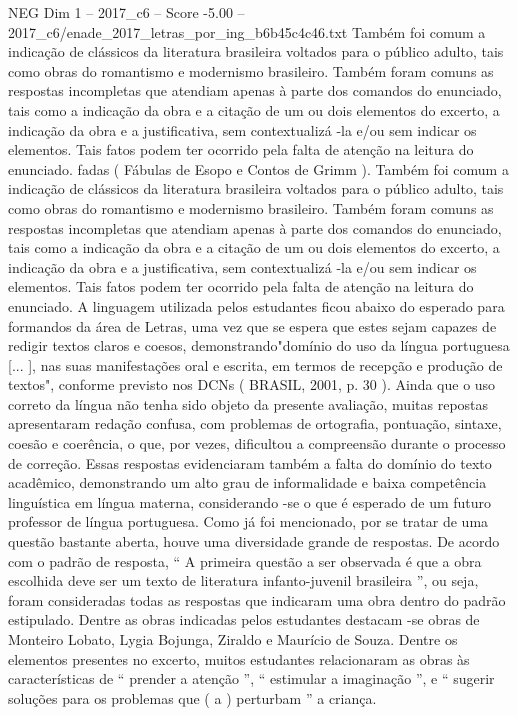 \begin{textsample}{NEG Dim 1 – 2017\_c6 – Score -5.00 – 2017\_c6/enade\_2017\_letras\_por\_ing\_b6b45c4c46.txt}
Também foi comum a indicação de clássicos da literatura brasileira voltados para o público adulto, tais como obras do romantismo e modernismo brasileiro.
Também foram comuns as respostas incompletas que atendiam apenas à parte dos comandos do enunciado, tais como a indicação da obra e a citação de um ou dois elementos do excerto, a indicação da obra e a justificativa, sem contextualizá -la e/ou sem indicar os elementos.
Tais fatos podem ter ocorrido pela falta de atenção na leitura do enunciado. fadas ( Fábulas de Esopo e Contos de Grimm ).
Também foi comum a indicação de clássicos da literatura brasileira voltados para o público adulto, tais como obras do romantismo e modernismo brasileiro.
Também foram comuns as respostas incompletas que atendiam apenas à parte dos comandos do enunciado, tais como a indicação da obra e a citação de um ou dois elementos do excerto, a indicação da obra e a justificativa, sem contextualizá -la e/ou sem indicar os elementos.
Tais fatos podem ter ocorrido pela falta de atenção na leitura do enunciado.
A linguagem utilizada pelos estudantes ficou abaixo do esperado para formandos da área de Letras, uma vez que se espera que estes sejam capazes de redigir textos claros e coesos, demonstrando"domínio do uso da língua portuguesa [... ], nas suas manifestações oral e escrita, em termos de recepção e produção de textos", conforme previsto nos DCNs ( BRASIL, 2001, p. 30 ).
Ainda que o uso correto da língua não tenha sido objeto da presente avaliação, muitas repostas apresentaram redação confusa, com problemas de ortografia, pontuação, sintaxe, coesão e coerência, o que, por vezes, dificultou a compreensão durante o processo de correção.
Essas respostas evidenciaram também a falta do domínio do texto acadêmico, demonstrando um alto grau de informalidade e baixa competência linguística em língua materna, considerando -se o que é esperado de um futuro professor de língua portuguesa.
Como já foi mencionado, por se tratar de uma questão bastante aberta, houve uma diversidade grande de respostas.
De acordo com o padrão de resposta, “ A primeira questão a ser observada é que a obra escolhida deve ser um texto de literatura infanto-juvenil brasileira ”, ou seja, foram consideradas todas as respostas que indicaram uma obra dentro do padrão estipulado.
Dentre as obras indicadas pelos estudantes destacam -se obras de Monteiro Lobato, Lygia Bojunga, Ziraldo e Maurício de Souza.
Dentre os elementos presentes no excerto, muitos estudantes relacionaram as obras às características de “ prender a atenção ”, “ estimular a imaginação ”, e “ sugerir soluções para os problemas que ( a ) perturbam ” a criança.

\end{textsample}
